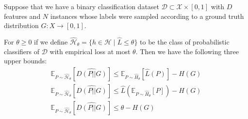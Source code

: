 \documentclass[12pt]{article}
\newenvironment{proposition}[2][Proposition]{\begin{trivlist}
\item[\hskip \labelsep {\bfseries #1}\hskip \labelsep {\bfseries #2.}]}{\end{trivlist}}
\begin{document}
\begin{proposition}{TEMP}
    Suppose that we have a binary classification dataset $\mathcal{D}\subset \mathcal{X}\times [0,1]$ with $D$ features and $N$ instances whose labels were sampled according to a ground truth distribution $G:X \rightarrow [0,1]$. 
    
    For $\theta \geq 0$ if we define $\hat{\mathcal{H}}_\theta = \{h\in \mathcal{H} \mid \hat{L} \leq \theta\}$ to be the class of probabilistic classifiers of $\mathcal{D}$ with empirical loss at most $\theta$. Then we have the following three upper bounds:
    \begin{gather*}
        \mathds{E}_{P\sim \hat{\mathcal{H}}_\theta}[\widehat{D(P||G)}] \leq \mathds{E}_{P\sim \hat{H}_\theta}[\hat{L}(P)] - H(G) \\
        \mathds{E}_{P\sim \hat{\mathcal{H}}_\theta}[\widehat{D(P||G)}] \leq \hat{L}(\mathds{E}_{P\sim \hat{H}_\theta}[P]) - H(G) \\
        \mathds{E}_{P\sim \hat{\mathcal{H}}_\theta}[\widehat{D(P||G)}] \leq \theta - H(G) \\
    \end{gather*}
\end{proposition}
\end{document}
